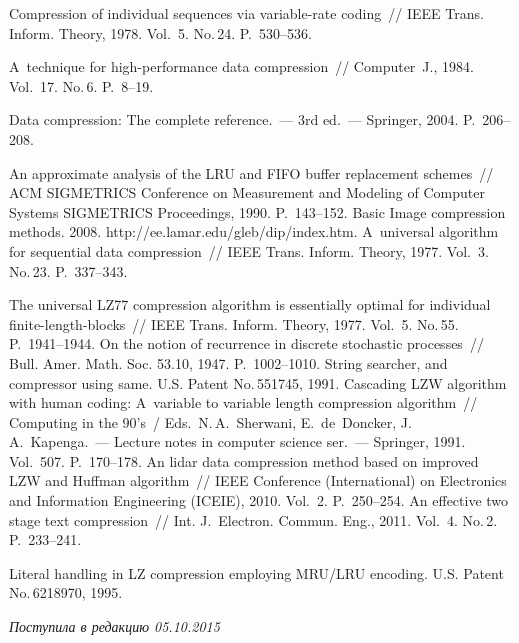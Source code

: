  \begin{multicols}{2}

\renewcommand{\bibname}{\protect\rmfamily Литература}

{\small\frenchspacing
{%
\begin{thebibliography}{99} 
 Compression of individual sequences via variable-rate
coding~// IEEE Trans. Inform. Theory, 1978. Vol.~5. No.\,24. P.~530--536.

 A~technique for high-performance data compression~// Computer~J., 1984.
Vol.~17. No.\,6. P.~8--19.

 Data compression:
The  complete reference.~--- 3rd ed.~--- Springer, 2004. P.~206--208.

 An approximate analysis of the LRU and FIFO buffer
replacement schemes~// ACM \mbox{SIGMETRICS} Conference
on Measurement and Modeling of Computer Systems SIGMETRICS Proceedings, 1990. P.~143--152.
   Basic Image compression methods.  2008.
{\sf http://ee.lamar.edu/gleb/dip/index.htm}.
 A~universal algorithm for sequential data compression~// 
IEEE Trans. Inform. Theory, 1977. Vol.~3. No.\,23. P.~337--343.


 The universal LZ77 compression algorithm is essentially optimal
for individual finite-length-blocks~// IEEE Trans. Inform. Theory,
1977. Vol.~5. No.\,55. P.~1941--1944.
 On the notion of recurrence in discrete stochastic processes~// 
Bull. Amer. Math. Soc. 53.10, 1947. P.~1002--1010.
 String searcher, and compressor using same. U.S. Patent No.\,551745,
1991.
 Cascading LZW algorithm with human coding: 
A~variable to variable length compression algorithm~// Computing in the 90's~/
 Eds.\  N.\,A.~Sherwani, E.~de~Doncker,  J.\,A.~Kapenga.~---
 Lecture notes in computer science ser.~--- Springer, 1991.  Vol.~507. P.~170--178.
 An lidar data compression method based on improved LZW and
Huffman algorithm~// IEEE  Conference (International) on Electronics and 
Information Engineering (ICEIE), 2010. Vol.~2. P.~250--254.
 An effective two stage text compression~// 
Int. J.~Electron. Commun. Eng., 2011. Vol.~4. No.\,2.
P.~233--241.

 Literal handling in LZ compression employing MRU/LRU
encoding.  U.S. Patent No.\,6218970, 1995. 
\end{thebibliography}
}}
\end{multicols}

 \label{end\stat}

 \vspace*{-6pt}

\hfill{\small\textit{Поступила в редакцию  05.10.2015}}
\renewcommand{\figurename}{\protect\bf Рис.}
\renewcommand{\tablename}{\protect\bf Таблица}